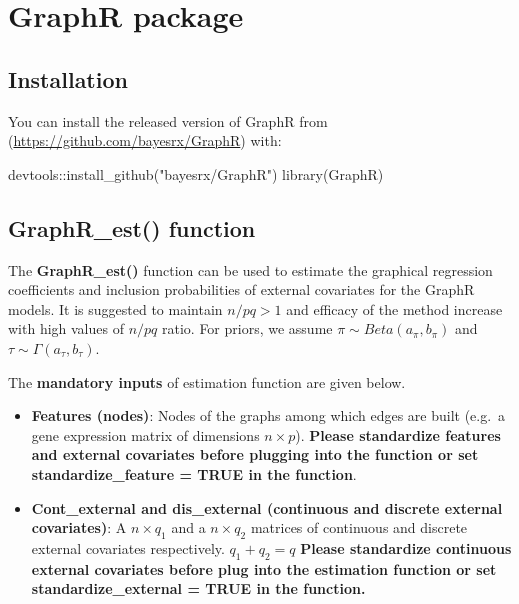 \documentclass[
]{book}
\newenvironment{Shaded}{\begin{snugshade}}{\end{snugshade}}
\newcommand{\FunctionTok}[1]{\textcolor[rgb]{0.00,0.00,0.00}{#1}}
\newcommand{\NormalTok}[1]{#1}
\newcommand{\SpecialCharTok}[1]{\textcolor[rgb]{0.00,0.00,0.00}{#1}}
\newcommand{\StringTok}[1]{\textcolor[rgb]{0.31,0.60,0.02}{#1}}
\begin{document}
\hypertarget{GraphRpackage}{%
\section{GraphR package}\label{GraphRpackage}}

\hypertarget{installation}{%
\subsection{Installation}\label{installation}}

You can install the released version of GraphR from (\url{https://github.com/bayesrx/GraphR}) with:

\begin{Shaded}
\begin{Highlighting}[]
\NormalTok{devtools}\SpecialCharTok{::}\FunctionTok{install\_github}\NormalTok{(}\StringTok{"bayesrx/GraphR"}\NormalTok{)}
\FunctionTok{library}\NormalTok{(GraphR)}
\end{Highlighting}
\end{Shaded}

\hypertarget{graphr_est-function}{%
\subsection{GraphR\_est() function}\label{graphr_est-function}}

The \textbf{GraphR\_est()} function can be used to estimate the graphical regression coefficients and inclusion probabilities of external covariates for the GraphR models. It is suggested to maintain \(n/pq >1\) and efficacy of the method increase with high values of \(n/pq\) ratio. For priors, we assume \(\pi \sim Beta(a_\pi, b_\pi)\) and \(\tau \sim \Gamma(a_\tau, b_\tau)\).

The \textbf{mandatory inputs} of estimation function are given below.

\begin{itemize}
\item
  \textbf{Features (nodes)}: Nodes of the graphs among which edges are built (e.g.~a gene expression matrix of dimensions \(n \times p\)). \textbf{Please standardize features and external covariates before plugging into the function or set standardize\_feature = TRUE in the function}.
\item
  \textbf{Cont\_external and dis\_external (continuous and discrete external covariates)}: A \(n \times q_1\) and a \(n \times q_2\) matrices of continuous and discrete external covariates respectively. \(q_1 + q_2 =q\) \textbf{Please standardize continuous external covariates before plug into the estimation function or set standardize\_external = TRUE in the function.}
\end{itemize}
\end{document}
